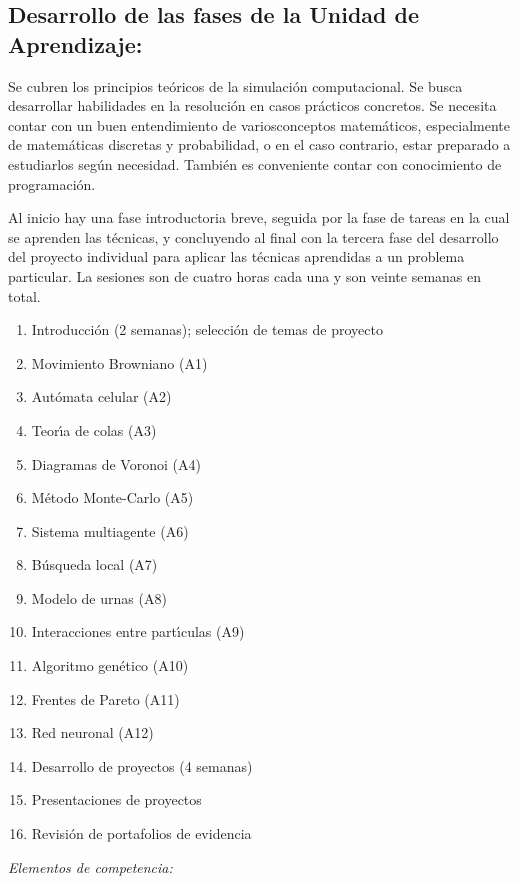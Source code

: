 \documentclass[10 pt]{article}
\begin{document}
\subsection{Desarrollo de las fases de la Unidad de Aprendizaje:}

Se cubren los principios te\'{o}ricos de la simulaci\'{o}n
computacional. Se busca desarrollar habilidades en la resoluci\'{o}n
en casos pr\'{a}cticos concretos. Se necesita contar con un buen
entendimiento de variosconceptos matem\'{a}ticos, especialmente
de matem\'{a}ticas discretas y probabilidad, o en el caso contrario,
estar preparado a estudiarlos seg\'{u}n necesidad. Tambi\'{e}n es
conveniente contar con conocimiento de programaci\'{o}n.

Al inicio hay una fase introductoria breve, seguida por la fase de
tareas en la cual se aprenden las t\'{e}cnicas, y concluyendo al final
con la tercera fase del desarrollo del proyecto individual para
aplicar las t\'{e}cnicas aprendidas a un problema particular. La
sesiones son de cuatro horas cada una y son veinte semanas en total.
\begin{enumerate}[itemsep=-3pt]
\item{Introducci\'{o}n (2 semanas); selecci\'{o}n de temas de proyecto}
\item{Movimiento Browniano (A1)}
\item{Aut\'{o}mata celular (A2)}
\item{Teor\'{\i}a de colas (A3)}
\item{Diagramas de Voronoi (A4)}
\item{M\'{e}todo Monte-Carlo (A5)}
\item{Sistema multiagente (A6)}
\item{B\'{u}squeda local (A7)}
\item{Modelo de urnas (A8)}
\item{Interacciones entre part\'{\i}culas (A9)}
\item{Algoritmo gen\'{e}tico (A10)}
\item{Frentes de Pareto (A11)}
\item{Red neuronal (A12)}
\item{Desarrollo de proyectos (4 semanas)}  
\item{Presentaciones de proyectos}
\item{Revisi\'{o}n de portafolios de evidencia}
\end{enumerate}

{\em Elementos de competencia:}


\end{document}
